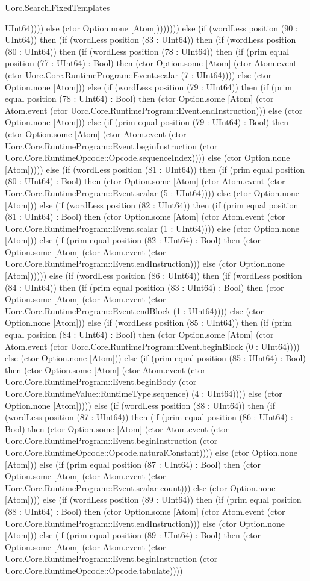 \begin{lexlean}{Uorc.Search.FixedTemplates}
\begin{semanticmodule}
{UInt64)))) else (ctor Option.none [Atom]))))))) else (if (wordLess position (90 : UInt64)) then (if (wordLess position (83 : UInt64)) then (if (wordLess position (80 : UInt64)) then (if (wordLess position (78 : UInt64)) then (if (prim equal position (77 : UInt64) : Bool) then (ctor Option.some [Atom] (ctor Atom.event (ctor Uorc.Core.RuntimeProgram::Event.scalar (7 : UInt64)))) else (ctor Option.none [Atom])) else (if (wordLess position (79 : UInt64)) then (if (prim equal position (78 : UInt64) : Bool) then (ctor Option.some [Atom] (ctor Atom.event (ctor Uorc.Core.RuntimeProgram::Event.endInstruction))) else (ctor Option.none [Atom])) else (if (prim equal position (79 : UInt64) : Bool) then (ctor Option.some [Atom] (ctor Atom.event (ctor Uorc.Core.RuntimeProgram::Event.beginInstruction (ctor Uorc.Core.RuntimeOpcode::Opcode.sequenceIndex)))) else (ctor Option.none [Atom])))) else (if (wordLess position (81 : UInt64)) then (if (prim equal position (80 : UInt64) : Bool) then (ctor Option.some [Atom] (ctor Atom.event (ctor Uorc.Core.RuntimeProgram::Event.scalar (5 : UInt64)))) else (ctor Option.none [Atom])) else (if (wordLess position (82 : UInt64)) then (if (prim equal position (81 : UInt64) : Bool) then (ctor Option.some [Atom] (ctor Atom.event (ctor Uorc.Core.RuntimeProgram::Event.scalar (1 : UInt64)))) else (ctor Option.none [Atom])) else (if (prim equal position (82 : UInt64) : Bool) then (ctor Option.some [Atom] (ctor Atom.event (ctor Uorc.Core.RuntimeProgram::Event.endInstruction))) else (ctor Option.none [Atom]))))) else (if (wordLess position (86 : UInt64)) then (if (wordLess position (84 : UInt64)) then (if (prim equal position (83 : UInt64) : Bool) then (ctor Option.some [Atom] (ctor Atom.event (ctor Uorc.Core.RuntimeProgram::Event.endBlock (1 : UInt64)))) else (ctor Option.none [Atom])) else (if (wordLess position (85 : UInt64)) then (if (prim equal position (84 : UInt64) : Bool) then (ctor Option.some [Atom] (ctor Atom.event (ctor Uorc.Core.RuntimeProgram::Event.beginBlock (0 : UInt64)))) else (ctor Option.none [Atom])) else (if (prim equal position (85 : UInt64) : Bool) then (ctor Option.some [Atom] (ctor Atom.event (ctor Uorc.Core.RuntimeProgram::Event.beginBody (ctor Uorc.Core.RuntimeValue::RuntimeType.sequence) (4 : UInt64)))) else (ctor Option.none [Atom])))) else (if (wordLess position (88 : UInt64)) then (if (wordLess position (87 : UInt64)) then (if (prim equal position (86 : UInt64) : Bool) then (ctor Option.some [Atom] (ctor Atom.event (ctor Uorc.Core.RuntimeProgram::Event.beginInstruction (ctor Uorc.Core.RuntimeOpcode::Opcode.naturalConstant)))) else (ctor Option.none [Atom])) else (if (prim equal position (87 : UInt64) : Bool) then (ctor Option.some [Atom] (ctor Atom.event (ctor Uorc.Core.RuntimeProgram::Event.scalar count))) else (ctor Option.none [Atom]))) else (if (wordLess position (89 : UInt64)) then (if (prim equal position (88 : UInt64) : Bool) then (ctor Option.some [Atom] (ctor Atom.event (ctor Uorc.Core.RuntimeProgram::Event.endInstruction))) else (ctor Option.none [Atom])) else (if (prim equal position (89 : UInt64) : Bool) then (ctor Option.some [Atom] (ctor Atom.event (ctor Uorc.Core.RuntimeProgram::Event.beginInstruction (ctor Uorc.Core.RuntimeOpcode::Opcode.tabulate)))) }
\end{semanticmodule}
\end{lexlean}
